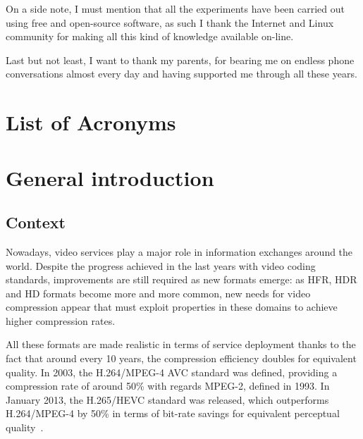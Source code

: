 \documentclass[11pt,a4paper,openright,twoside]{book}
\numberwithin{equation}{section} %
\numberwithin{figure}{section} %
\numberwithin{table}{section} %
\begin{document}
On a side note, I must mention that all the experiments have been carried out
using free and open-source software, as such I thank the Internet and Linux
community for making all this kind of knowledge available on-line.

Last but not least, I want to thank my parents, for bearing me on endless
phone conversations almost every day and having supported me through all
these years.

\tableofcontents
\cleardoublepage
\chapter*{List of Acronyms}
\label{cha:glossary}

\cleardoublepage
\listoffigures
\cleardoublepage
\listoftables
\cleardoublepage

\mainmatter

\chapter*{General introduction}
\label{cha:general_intoduction}

\section*{Context}
\label{sec:context}

Nowadays, video services play a major role in information exchanges around the
world.
Despite the progress achieved in the last years with video coding standards,
improvements are still required as new formats emerge:
as \ac{HFR}, \ac{HDR} and \ac{HD} formats become more and more common, new
needs for video compression appear that must exploit properties in these
domains to achieve higher compression rates.

All these formats are made realistic in terms of service deployment thanks to
the fact that around every 10 years, the compression efficiency doubles for
equivalent quality.
In 2003, the H.264/\acs{MPEG}-4 \acs{AVC} standard was defined, providing
a compression rate of around 50\% with regards \acs{MPEG}-2, defined
in 1993.
In January 2013, the H.265/\acs{HEVC} standard was released, which
outperforms H.264/\acs{MPEG}-4 by 50\% in terms of bit-rate savings for
equivalent perceptual quality~\cite{sullivan-12-overview-hevc}.
\end{document}
